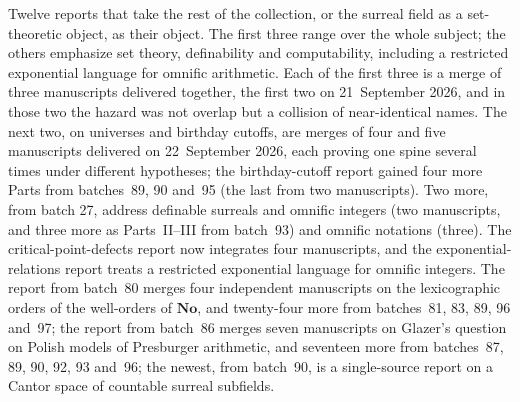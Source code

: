 \documentclass[11pt]{article}
\newcommand{\No}{\mathbf{No}}
\begin{document}
Twelve reports that take the rest of the collection, or the surreal field as a
set-theoretic object, as their object.  The first three range over the whole subject; the others emphasize set
theory, definability and computability, including a restricted exponential
language for omnific arithmetic.  Each of
the first three is a merge of three manuscripts delivered together, the first
two on 21~September 2026, and in those two the hazard was not overlap but a
collision of near-identical names.  The next two, on universes and birthday
cutoffs, are merges of four and five
manuscripts delivered on 22~September 2026, each proving one spine several
times under different hypotheses; the birthday-cutoff report gained four
more Parts from batches~89, 90 and~95 (the last from two manuscripts).  Two
more, from batch 27, address definable surreals and omnific integers (two
manuscripts, and three more as Parts~II--III from batch~93) and omnific
notations (three). The critical-point-defects report now integrates four manuscripts,
and the exponential-relations report treats a restricted exponential
language for omnific integers.  The report from batch~80 merges four
independent manuscripts on the lexicographic orders of the well-orders of
$\No$, and twenty-four more from batches~81, 83, 89, 96 and~97; the report from
batch~86 merges seven manuscripts on Glazer's question on Polish models
of Presburger arithmetic, and seventeen more from batches~87, 89, 90, 92,
93 and~96; the newest, from batch~90, is a single-source report on a Cantor space of
countable surreal subfields.
\end{document}
